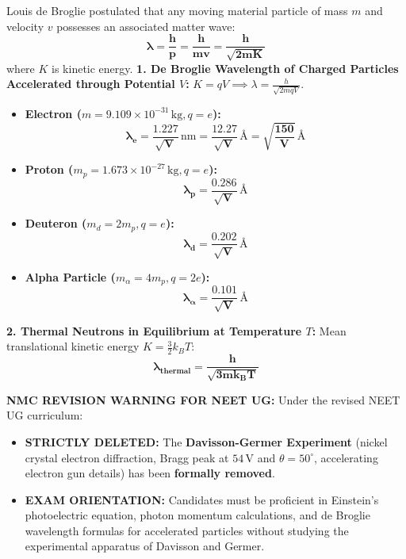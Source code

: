 \documentclass[10pt,twoside,openright]{book}
\begin{document}
\begin{formulabox}
Louis de Broglie postulated that any moving material particle of mass $m$ and velocity $v$ possesses an associated matter wave:
\begin{equation}
  \mathbf{\lambda = \frac{h}{p} = \frac{h}{m v} = \frac{h}{\sqrt{2 m K}}}
\end{equation}
where $K$ is kinetic energy.
\textbf{1. De Broglie Wavelength of Charged Particles Accelerated through Potential $V$:}
$K = q V \implies \lambda = \frac{h}{\sqrt{2 m q V}}$.
\begin{itemize}
  \item \textbf{Electron ($m = 9.109 \times 10^{-31}\,\mathrm{kg}, q = e$):}
  \begin{equation}
    \mathbf{\lambda_e = \frac{1.227}{\sqrt{V}}\,\mathrm{nm} = \frac{12.27}{\sqrt{V}}\,\text{\AA} = \sqrt{\frac{150}{V}}\,\text{\AA}}
  \end{equation}
  \item \textbf{Proton ($m_p = 1.673 \times 10^{-27}\,\mathrm{kg}, q = e$):}
  \begin{equation}
    \mathbf{\lambda_p = \frac{0.286}{\sqrt{V}}\,\text{\AA}}
  \end{equation}
  \item \textbf{Deuteron ($m_d = 2m_p, q = e$):}
  \begin{equation}
    \mathbf{\lambda_d = \frac{0.202}{\sqrt{V}}\,\text{\AA}}
  \end{equation}
  \item \textbf{Alpha Particle ($m_\alpha = 4m_p, q = 2e$):}
  \begin{equation}
    \mathbf{\lambda_\alpha = \frac{0.101}{\sqrt{V}}\,\text{\AA}}
  \end{equation}
\end{itemize}
\textbf{2. Thermal Neutrons in Equilibrium at Temperature $T$:}
Mean translational kinetic energy $K = \frac{3}{2}k_B T$:
\begin{equation}
  \mathbf{\lambda_{\text{thermal}} = \frac{h}{\sqrt{3 m k_B T}}}
\end{equation}
\end{formulabox}

\begin{trapbox}
\textbf{NMC REVISION WARNING FOR NEET UG:}
Under the revised NEET UG curriculum:
\begin{itemize}
  \item \textbf{STRICTLY DELETED:} The \textbf{Davisson-Germer Experiment} (nickel crystal electron diffraction, Bragg peak at $54\,\mathrm{V}$ and $\theta = 50^\circ$, accelerating electron gun details) has been \textbf{formally removed}.
  \item \textbf{EXAM ORIENTATION:} Candidates must be proficient in Einstein's photoelectric equation, photon momentum calculations, and de Broglie wavelength formulas for accelerated particles without studying the experimental apparatus of Davisson and Germer.
\end{itemize}
\end{trapbox}
\end{document}
